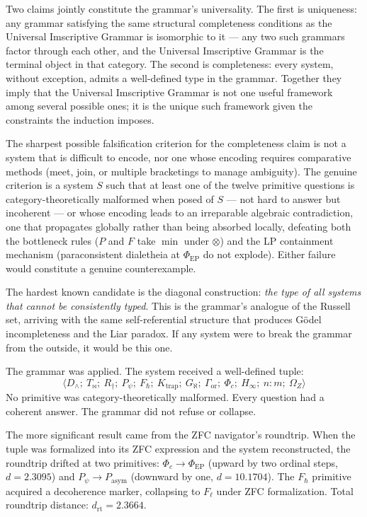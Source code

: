 \documentclass[12pt,a4paper]{article}
\newcommand{\UIG}{Universal Imscriptive Grammar}
\begin{document}
Two claims jointly constitute the grammar's universality. The first is uniqueness: any grammar satisfying the same structural completeness conditions as the \UIG{} is isomorphic to it --- any two such grammars factor through each other, and the \UIG{} is the terminal object in that category. The second is completeness: every system, without exception, admits a well-defined type in the grammar. Together they imply that the \UIG{} is not one useful framework among several possible ones; it is the unique such framework given the constraints the induction imposes.

The sharpest possible falsification criterion for the completeness claim is not a system that is difficult to encode, nor one whose encoding requires comparative methods (meet, join, or multiple bracketings to manage ambiguity). The genuine criterion is a system $S$ such that at least one of the twelve primitive questions is category-theoretically malformed when posed of $S$ --- not hard to answer but incoherent --- or whose encoding leads to an irreparable algebraic contradiction, one that propagates globally rather than being absorbed locally, defeating both the bottleneck rules ($P$ and $F$ take $\min$ under $\otimes$) and the LP containment mechanism (paraconsistent dialetheia at $\Phi_\text{EP}$ do not explode). Either failure would constitute a genuine counterexample.

The hardest known candidate is the diagonal construction: \emph{the type of all systems that cannot be consistently typed}. This is the grammar's analogue of the Russell set, arriving with the same self-referential structure that produces G\"odel incompleteness and the Liar paradox. If any system were to break the grammar from the outside, it would be this one.

The grammar was applied. The system received a well-defined tuple:
$$\langle D_\wedge;\ T_{\bowtie};\ R_\dagger;\ P_\psi;\ F_\hbar;\ K_\text{trap};\ G_\aleph;\ \Gamma_\text{or};\ \Phi_c;\ H_\infty;\ n{:}m;\ \Omega_Z \rangle$$
No primitive was category-theoretically malformed. Every question had a coherent answer. The grammar did not refuse or collapse.

The more significant result came from the ZFC navigator's roundtrip. When the tuple was formalized into its ZFC expression and the system reconstructed, the roundtrip drifted at two primitives: $\Phi_c \to \Phi_\text{EP}$ (upward by two ordinal steps, $d = 2.3095$) and $P_\psi \to P_\text{asym}$ (downward by one, $d = 10.1704$). The $F_\hbar$ primitive acquired a decoherence marker, collapsing to $F_\ell$ under ZFC formalization. Total roundtrip distance: $d_\text{rt} = 2.3664$.
\end{document}

